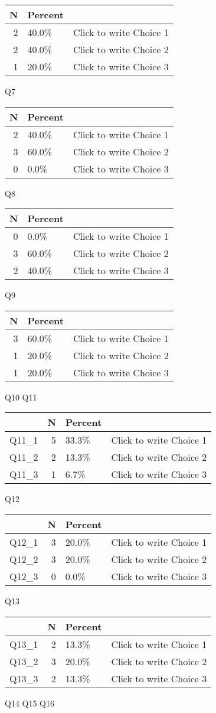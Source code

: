 \documentclass{article}\usepackage[]{graphicx}\usepackage[]{color}
\begin{document}
\begin{tabular}{r|l|l}
\hline
N & Percent & \\
\hline
2 & 40.0\% & Click to write Choice 1\\
\hline
2 & 40.0\% & Click to write Choice 2\\
\hline
1 & 20.0\% & Click to write Choice 3\\
\hline
\end{tabular}
Q7

\begin{tabular}{r|l|l}
\hline
N & Percent & \\
\hline
2 & 40.0\% & Click to write Choice 1\\
\hline
3 & 60.0\% & Click to write Choice 2\\
\hline
0 & 0.0\% & Click to write Choice 3\\
\hline
\end{tabular}
Q8

\begin{tabular}{r|l|l}
\hline
N & Percent & \\
\hline
0 & 0.0\% & Click to write Choice 1\\
\hline
3 & 60.0\% & Click to write Choice 2\\
\hline
2 & 40.0\% & Click to write Choice 3\\
\hline
\end{tabular}
Q9

\begin{tabular}{r|l|l}
\hline
N & Percent & \\
\hline
3 & 60.0\% & Click to write Choice 1\\
\hline
1 & 20.0\% & Click to write Choice 2\\
\hline
1 & 20.0\% & Click to write Choice 3\\
\hline
\end{tabular}
Q10
Q11

\begin{tabular}{l|r|l|l}
\hline
  & N & Percent & \\
\hline
Q11\_1 & 5 & 33.3\% & Click to write Choice 1\\
\hline
Q11\_2 & 2 & 13.3\% & Click to write Choice 2\\
\hline
Q11\_3 & 1 & 6.7\% & Click to write Choice 3\\
\hline
\end{tabular}
Q12

\begin{tabular}{l|r|l|l}
\hline
  & N & Percent & \\
\hline
Q12\_1 & 3 & 20.0\% & Click to write Choice 1\\
\hline
Q12\_2 & 3 & 20.0\% & Click to write Choice 2\\
\hline
Q12\_3 & 0 & 0.0\% & Click to write Choice 3\\
\hline
\end{tabular}
Q13

\begin{tabular}{l|r|l|l}
\hline
  & N & Percent & \\
\hline
Q13\_1 & 2 & 13.3\% & Click to write Choice 1\\
\hline
Q13\_2 & 3 & 20.0\% & Click to write Choice 2\\
\hline
Q13\_3 & 2 & 13.3\% & Click to write Choice 3\\
\hline
\end{tabular}
Q14
Q15
Q16
\end{document}
